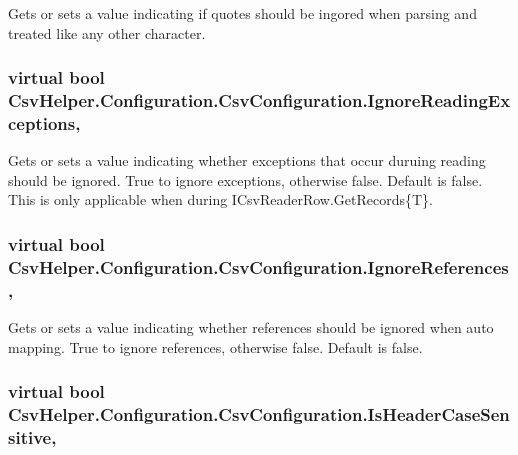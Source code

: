 Gets or sets a value indicating if quotes should be ingored when parsing and treated like any other character. 

\hypertarget{a00043_a8645dbd4fe2a9c443910695a93b1027f}{
\subsubsection[{Ignore\-Reading\-Exceptions}]{\setlength{\rightskip}{0pt plus 5cm}virtual bool Csv\-Helper.\-Configuration.\-Csv\-Configuration.\-Ignore\-Reading\-Exceptions\hspace{0.3cm}{\ttfamily [get]}, {\ttfamily [set]}}}\label{a00043_a8645dbd4fe2a9c443910695a93b1027f}


Gets or sets a value indicating whether exceptions that occur duruing reading should be ignored. True to ignore exceptions, otherwise false. Default is false. This is only applicable when during I\-Csv\-Reader\-Row.\-Get\-Records\{\-T\}. 

\hypertarget{a00043_a27a2d1b69b3025969a94cd903db9d00a}{
\subsubsection[{Ignore\-References}]{\setlength{\rightskip}{0pt plus 5cm}virtual bool Csv\-Helper.\-Configuration.\-Csv\-Configuration.\-Ignore\-References\hspace{0.3cm}{\ttfamily [get]}, {\ttfamily [set]}}}\label{a00043_a27a2d1b69b3025969a94cd903db9d00a}


Gets or sets a value indicating whether references should be ignored when auto mapping. True to ignore references, otherwise false. Default is false. 

\hypertarget{a00043_aeee80e98871bbc6fe74b87be1c616a8d}{
\subsubsection[{Is\-Header\-Case\-Sensitive}]{\setlength{\rightskip}{0pt plus 5cm}virtual bool Csv\-Helper.\-Configuration.\-Csv\-Configuration.\-Is\-Header\-Case\-Sensitive\hspace{0.3cm}{\ttfamily [get]}, {\ttfamily [set]}}}\label{a00043_aeee80e98871bbc6fe74b87be1c616a8d}


